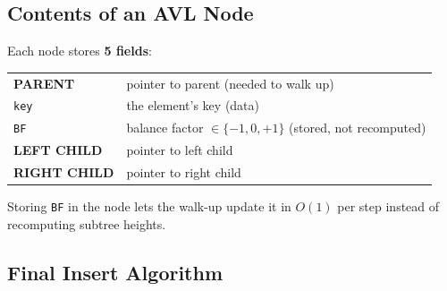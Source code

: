 \documentclass[11pt]{article}
\begin{document}
\subsection{Contents of an AVL Node}

\begin{defbox}
Each node stores \textbf{5 fields}:
\begin{center}
\renewcommand{\arraystretch}{1.35}
\begin{tabular}{l l}
\hline
\textcolor{rustW}{\textbf{PARENT}} & pointer to parent (needed to walk up)\\
\texttt{key} & the element's key (data)\\
\texttt{BF} & balance factor $\in \{-1,0,+1\}$ (stored, not recomputed)\\
\textcolor{greenO}{\textbf{LEFT CHILD}} & pointer to left child\\
\textcolor{heapblue}{\textbf{RIGHT CHILD}} & pointer to right child\\
\hline
\end{tabular}
\end{center}
Storing \texttt{BF} in the node lets the walk-up update it in $O(1)$ per step instead of recomputing subtree heights.
\end{defbox}

\subsection{Final Insert Algorithm}
\end{document}
